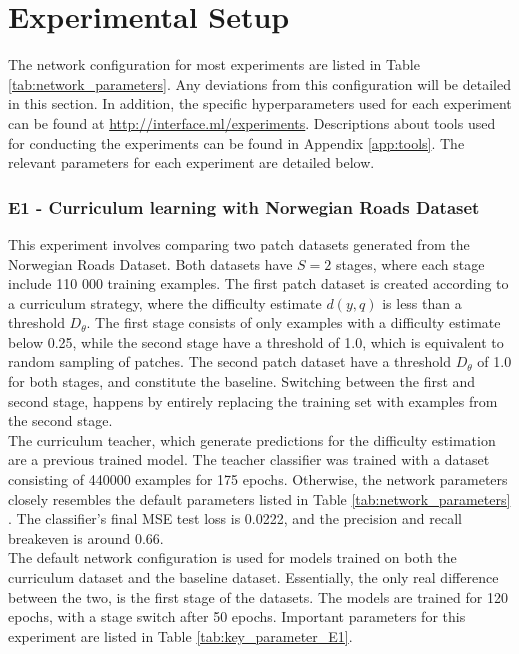 \section{Experimental Setup}
\label{sec:experimentalSetup}
The network configuration for most experiments are listed in Table \ref{tab:network_parameters}. Any deviations from this configuration will be detailed in this section. In addition, the specific hyperparameters used for each experiment can be found at \url{http://interface.ml/experiments}. Descriptions about tools used for conducting the experiments can be found in Appendix \ref{app:tools}. The relevant parameters for each experiment are detailed below.\\ 

\subsubsection{E1 - Curriculum learning with Norwegian Roads Dataset}
This experiment involves comparing two patch datasets generated from the Norwegian Roads Dataset. Both datasets have $S=2$ stages, where each stage include 110 000 training examples. The first patch dataset is created according to a curriculum strategy, where the difficulty estimate $d(y, q)$ is less than a threshold $D_\theta$. The first stage consists of only examples with a difficulty estimate below 0.25,  while the second stage have a threshold of 1.0, which is equivalent to random sampling of patches. The second patch dataset have a threshold $D_\theta$ of 1.0 for both stages, and constitute the baseline. Switching between the first and second stage, happens by entirely replacing the training set with examples from the second stage.\\

The curriculum teacher, which generate predictions for the difficulty estimation are a previous trained model. The teacher classifier was trained with a dataset consisting of 440000 examples for 175 epochs. Otherwise, the network parameters closely resembles the default parameters listed in Table \ref{tab:network_parameters} . The classifier's final \ac{MSE} test loss is 0.0222, and the precision and recall breakeven is around 0.66. \\

The default network configuration is used for models trained on both the curriculum dataset and the baseline dataset. Essentially, the only real difference between the two, is the first stage of the datasets. The models are trained for 120 epochs, with a stage switch after 50 epochs. Important parameters for this experiment are listed in Table \ref{tab:key_parameter_E1}.\\

